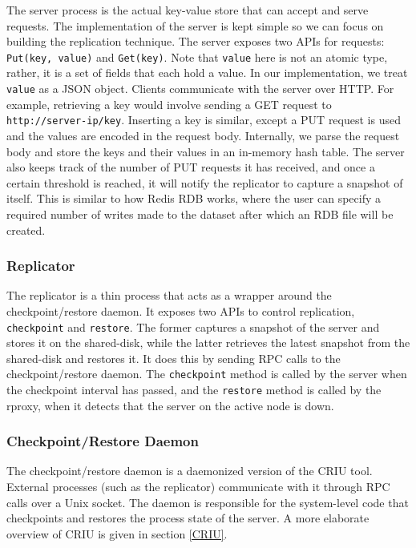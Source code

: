 \documentclass[final]{proc}
\begin{document}
The server process is the actual key-value store that can accept and serve
requests. The implementation of the server is kept simple so we can focus on
building the replication technique. The server exposes two APIs for requests:
\verb|Put(key, value)| and \verb|Get(key)|. Note that \verb|value| here is not
an atomic type, rather, it is a set of fields that each hold a value. In our
implementation, we treat \verb|value| as a JSON object. Clients communicate with
the server over HTTP. For example, retrieving a key would involve sending a GET
request to \verb|http://server-ip/key|. Inserting a key is similar, except a PUT
request is used and the values are encoded in the request body. Internally, we
parse the request body and store the keys and their values in an in-memory hash
table. The server also keeps track of the number of PUT requests it has
received, and once a certain threshold is reached, it will notify the replicator
to capture a snapshot of itself. This is similar to how Redis RDB works, where
the user can specify a required number of writes made to the dataset after
which an RDB file will be created.

\subsubsection{Replicator}

The replicator is a thin process that acts as a wrapper around the
checkpoint/restore daemon. It exposes two APIs to control replication,
\verb|checkpoint| and \verb|restore|. The former captures a snapshot of the
server and stores it on the shared-disk, while the latter retrieves the latest
snapshot from the shared-disk and restores it. It does this by sending RPC calls
to the checkpoint/restore daemon. The \verb|checkpoint| method is called by the
server when the checkpoint interval has passed, and the \verb|restore| method is
called by the rproxy, when it detects that the server on the active node is
down.

\subsubsection{Checkpoint/Restore Daemon}

The checkpoint/restore daemon is a daemonized version of the CRIU tool. External
processes (such as the replicator) communicate with it through RPC calls over a
Unix socket. The daemon is responsible for the system-level code that
checkpoints and restores the process state of the server. A more elaborate
overview of CRIU is given in section \ref{CRIU}.
\end{document}

